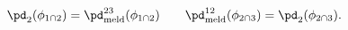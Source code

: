 \begin{equation}
  \pd_{2}(\phi_{1 \cap 2}) = \pd_{\text{meld}}^{23}(\phi_{1 \cap 2}) \qquad
  \pd_{\text{meld}}^{12}(\phi_{2 \cap 3}) = \pd_{2}(\phi_{2 \cap 3}).
  \label{eqn:orig-melding-commutative-equalities}
\end{equation}